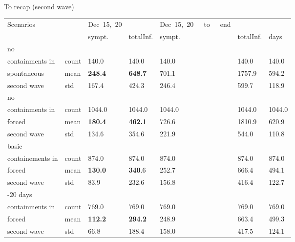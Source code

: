 \documentclass[8pt]{beamer}
\begin{document}
\begin{frame}{To recap (second wave)}

\begin{table}[H]
\center
\footnotesize
\begin{tabular}{p{1.8cm}p{0.5cm}p{0.5cm}p{0.5cm}p{0.5cm}p{0.5cm}p{0.5cm}}
\toprule
Scenarios     &    &  Dec~15,~20 &               & Dec~15,~20~~~to~~~end  &  &\\
                     &    & sympt.           &  totalInf. &  sympt. &  totalInf.  & days   \\                               

\midrule
no \\
containments in   & count & 140.0 &                      140.0 &                140.0 &                   140.0 &  140.0 \\
spontaneous         &  mean  &  \textbf{248.4} &                      \textbf{648.7} &      701.1 &                  1757.9 &  594.2 \\
second wave         & std  &  167.4 &                      424.3 &               246.4 &                   599.7 &  118.9 \\

\midrule
no \\
containments in   & count &     1044.0 &                     1044.0 &             1044.0 &                  1044.0 & 1044.0 \\
forced         & mean  &       \textbf{180.4} &                      \textbf{462.1} &          726.6 &                  1810.9 &  620.9 \\
second wave         & std   & 134.6 &                      354.6 &           221.9 &                   544.0 &  110.8 \\

\midrule
basic \\
containements in   & count &     874.0 &                      874.0 &          874.0 &                   874.0 &  874.0 \\
forced                    & mean  &             \textbf{130.0} &                      \textbf{340}.6 &                 252.7 &                   666.4 &  494.1 \\
second wave         & std   &   83.9 &                      232.6 &                  156.8 &                   416.4 &  122.7 \\
         
\midrule
-20 days \\ 
containments in   & count &  769.0 &                      769.0 &               769.0 &                   769.0 &  769.0 \\
forced             & mean  &   \textbf{{\color{red}112.2}} &        \textbf{{\color{red} 294.2}} &       248.9 &        663.4 &  499.3 \\
second wave  & std   &   66.8 &                      188.4 &          158.0 &                   417.5 &  124.1 \\


\end{tabular}
\end{table}
\end{frame}
\end{document}
